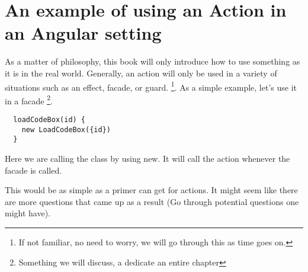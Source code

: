 \section{An example of using an Action in an Angular setting}
As a matter of philosophy, this book will only introduce how to use something
as it is in the real world. Generally, an action will only be used in a variety
of situations such as an effect, facade, or guard. \footnote{If not familiar, no
need to worry, we will go through this as time goes on.}. As a simple example,
let's use it in a facade \footnote{Something we will discuss, a dedicate an
entire chapter}.

\begin{lstlisting}
  loadCodeBox(id) {
    new LoadCodeBox({id})
  }
\end{lstlisting}

Here we are calling the class by using new. It will call the action whenever the
facade is called.

This would be as simple as a primer can get for actions. It might seem like
there are more questions that came up as a result (Go through potential
questions one might have).
